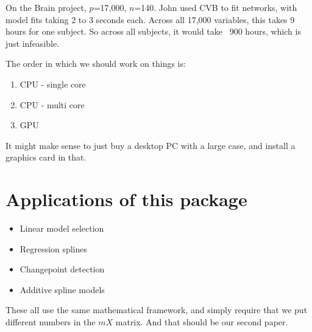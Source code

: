\documentclass{amsart}
\begin{document}
On the Brain project, $p$=17,000, $n$=140. John used CVB to fit networks, with model fits taking 2 to 3
seconds each. Across all 17,000 variables, this takes 9 hours for one subject. So across all subjects, it
would take ~900 hours, which is just infeasible.

The order in which we should work on things is:
\begin{enumerate}
\item CPU - single core
\item CPU - multi core
\item GPU
\end{enumerate}

It might make sense to just buy a desktop PC with a large case, and install a graphics card in that.

\section{Applications of this package}
\begin{itemize}
\item Linear model selection
\item Regression splines
\item Changepoint detection
\item Additive spline models
\end{itemize}

These all use the same mathematical framework, and simply require that we put different numbers in the $mX$
matrix. And that should be our second paper.
\end{document}
